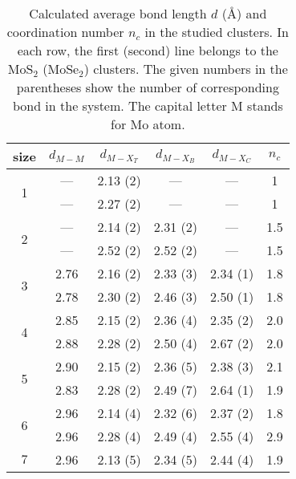 \documentclass[nofootinbib,10pt,aip,twocolumn,showpacs]{revtex4-1}
\begin{document}
\begin{table}[!htb]
\caption{\label{bond}
  Calculated average bond length $d$ (\AA) and coordination number $n_c$ 
  in the studied clusters.
  In each row, the first (second) line belongs to the MoS$_2$ (MoSe$_2$) clusters.
  The given numbers in the parentheses show the number of corresponding bond in the system.
  The capital letter M stands for Mo atom.}
\begin{ruledtabular}
\begin{tabular}{cccccc}
 size 
 & $d_{M-M}$ & $d_{M-X_T}$ & $d_{M-X_B}$ & $d_{M-X_C}$ & $n_c$ \\ \hline

\multirow{2}{*}{1} 
 &    ---    &   2.13 (2)  &     ---     &    ---      &   1   \\
 &    ---    &   2.27 (2)  &     ---     &    ---      &   1   \\ \hline
\multirow{2}{*}{2}
%
 &    ---    &   2.14 (2)  &   2.31 (2)  &    ---      &  1.5  \\  
 &    ---    &   2.52 (2)  &   2.52 (2)  &    ---      &  1.5  \\ \hline
\multirow{2}{*}{3}
%
 &    2.76   &   2.16 (2)  &   2.33 (3)  &   2.34 (1)  &  1.8  \\
 &    2.78   &   2.30 (2)  &   2.46 (3)  &   2.50 (1)  &  1.8  \\ \hline
\multirow{2}{*}{4}
%
 &    2.85   &   2.15 (2)  &   2.36 (4)  &   2.35 (2)  &  2.0  \\
 &    2.88   &   2.28 (2)  &   2.50 (4)  &   2.67 (2)  &  2.0  \\ \hline
\multirow{2}{*}{5} 
%
 &    2.90   &   2.15 (2)  &   2.36 (5)  &   2.38 (3)  &  2.1  \\
 &    2.83   &   2.28 (2)  &   2.49 (7)  &   2.64 (1)  &  1.9  \\ \hline
\multirow{2}{*}{6} 
%
 &    2.96   &   2.14 (4)  &   2.32 (6)  &   2.37 (2)  &  1.8  \\
 &    2.96   &   2.28 (4)  &   2.49 (4)  &   2.55 (4)  &  2.9  \\ \hline
\multirow{2}{*}{$7$}
% 
 &    2.96   &   2.13 (5)  &   2.34 (5)  &   2.44 (4)  &  1.9  \\

\end{tabular}
\end{ruledtabular}
\end{table}
\end{document}
